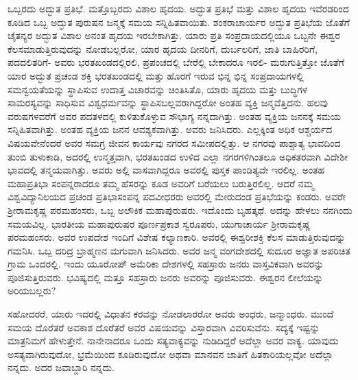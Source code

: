 ಒಬ್ಬರದು ಅದ್ಭುತ ಪ್ರತಿಭೆ. ಮತ್ತೊಬ್ಬರದು ವಿಶಾಲ ಹೃದಯ. ಅದ್ಭುತ ಪ್ರತಿಭೆ ಮತ್ತು ವಿಶಾಲ ಹೃದಯ ಇವೆರಡರಿಂದ ಕೂಡಿದ ಒಬ್ಬ ಅದ್ಭುತ ಪುರುಷನ ಜನ್ಮಕ್ಕೆ ಸಮಯ ಸನ್ನಿಹಿತವಾಯಿತು. ಶಂಕರಾಚಾರ್ಯರ ಅದ್ಭುತ ಪ್ರತಿಭೆಯ ಜೊತೆಗೆ ಚೈತನ್ಯರ ಅದ್ಭುತ ವಿಶಾಲ ಅನಂತ ಹೃದಯ ಇರಬೇಕಾಗಿತ್ತು. ಯಾರು ಪ್ರತಿ ಸಂಪ್ರದಾಯದಲ್ಲಿಯೂ ಒಬ್ಬನೇ ಈಶ್ವರ ಕೆಲಸಮಾಡುತ್ತಿರುವುದನ್ನು ನೋಡಬಲ್ಲರೋ, ಯಾರ ಹೃದಯ ದೀನರಿಗೆ, ದುರ್ಬಲರಿಗೆ, ಜಾತಿ ಬಾಹಿರರಿಗೆ, ಪದದಲಿತರಿಗೆ- ಅವರು ಭರತಖಂಡದಲ್ಲಿರಲಿ, ಪ್ರಪಂಚದಲ್ಲಿ ಬೇರೆಲ್ಲಿ ಬೇಕಾದರೂ ಇರಲಿ- ಮರುಗುತ್ತಿತ್ತೋ ಜೊತೆಗೆ ಯಾರ ಅದ್ಭುತ ಪ್ರಚಂಡ ಶಕ್ತಿ ಭರತಖಂಡದಲ್ಲಿ ಮತ್ತು ಹೊರಗೆ ಇರುವ ಭಿನ್ನ ಭಿನ್ನ ಸಂಪ್ರದಾಯಗಳಲ್ಲಿ ಸಮನ್ವಯತೆಯನ್ನು ಸ್ಥಾಪಿಸುವ ಉದಾತ್ತ ವಿಚಾರವನ್ನು ಚಿಂತಿಸಿತೊ, ಯಾರು ಹೃದಯ ಮತ್ತು ಬುದ್ಧಿಗಳ ಸಾಮರಸ್ಯವನ್ನು ಸಾಧಿಸುವ ವಿಶ್ವಧರ್ಮವನ್ನು ಸ್ಥಾಪಿಸಬಲ್ಲವರಾಗಿದ್ದರೋ ಅಂತಹ ವ್ಯಕ್ತಿ ಜನ್ಮವೆತ್ತಿದನು. ಹಲವು ವರುಷಗಳವರೆಗೆ ಅವರ ಪದತಳದಲ್ಲಿ ಕುಳಿತುಕೊಳ್ಳುವ ಸೌಭಾಗ್ಯ ನನ್ನದಾಗಿತ್ತು. ಅಂತಹ ವ್ಯಕ್ತಿಯ ಜನನಕ್ಕೆ ಸಮಯ ಸನ್ನಿಹಿತವಾಗಿತ್ತು. ಅಂತಹ ವ್ಯಕ್ತಿಯ ಜನನ ಆವಶ್ಯಕವಾಗಿತ್ತು. ಅವರು ಜನಿಸಿದರು. ಎಲ್ಲಕ್ಕಿಂತ ಅಧಿಕ ಆಶ್ಚರ್ಯದ ವಿಷಯವೇನೆಂದರೆ ಅವರ ಸಮಗ್ರ ಜೀವನ ಕಾರ್ಯವು ನಗರದ ಸಮೀಪದಲ್ಲಿತ್ತು. ಆ ನಗರವು ಪಾಶ್ಚಾತ್ಯ ಭಾವದಿಂದ ತುಂಬಿ ತುಳುಕಾಡಿ, ಅದರಲ್ಲಿ ಉನ್ಮತ್ತವಾಗಿ, ಭರತಖಂಡದ ಉಳಿದ ಎಲ್ಲಾ ನಗರಗಳಿಗಿಂತಲೂ ಅಧಿಕತರವಾಗಿ ವಿದೇಶೀ ಭಾವದಲ್ಲಿ ತನ್ಮಯವಾಗಿತ್ತು. ಅವರು ಅಲ್ಲಿ ವಾಸವಾಗಿದ್ದರೂ ಅವರಲ್ಲಿ ಪುಸ್ತಕ ಪಾಂಡಿತ್ಯವೇ ಇರಲಿಲ್ಲ. ಅಂತಹ ಮಹಾಪ್ರತಿಭಾ ಸಂಪನ್ನರಾದರೂ ತಮ್ಮ ಹೆಸರನ್ನು ಕೂಡ ಅವರಿಗೆ ಬರೆಯಲು ಬರುತ್ತಿರಲಿಲ್ಲ. ಆದರೆ ನಮ್ಮ ವಿಶ್ವವಿದ್ಯಾನಿಲಯದ ಪ್ರಚಂಡ ಪ್ರತಿಭಾಸಂಪನ್ನ ಪದವೀಧರರು ಅವರಲ್ಲಿ ಮೇರುದಂಡ ಪ್ರತಿಭೆಯನ್ನು ಕಂಡರು. ಅವರೇ ಶ‍್ರೀರಾಮಕೃಷ್ಣ ಪರಮಹಂಸರು, ಒಬ್ಬ ಅಲೌಕಿಕ ಮಹಾಪುರುಷರು. ಇದೊಂದು ಬೃಹತ್ಕಥೆ. ಅದನ್ನು ಹೇಳಲು ನನಗಿಂದು ಸಮಯವಿಲ್ಲ. ಭಾರತೀಯ ಮಹಾಪುರುಷರ ಪೂರ್ಣಪ್ರಕಾಶ ಸ್ವರೂಪರು, ಯುಗಾಚಾರ್ಯ ಶ‍್ರೀರಾಮಕೃಷ್ಣ ಪರಮಹಂಸರು. ಅವರ ಉಪದೇಶ ಇಂದಿಗೆ ವಿಶೇಷ ಕಲ್ಯಾಣಕಾರಿ. ಅವರಲ್ಲಿ ಈಶ್ವರೀಶಕ್ತಿ ಕೆಲಸ ಮಾಡುತ್ತಿರುವುದನ್ನು ಗಮನಿಸಿ. ಒಬ್ಬ ದರಿದ್ರ ಬ್ರಾಹ್ಮಣನ ಮಗುವಾಗಿ ಜನಿಸಿದರು. ಅವರ ಜನ್ಮ ವಂಗದೇಶದಲ್ಲಿ ಸುದೂರ ಅಜ್ಞಾತ ಅಪರಿಚಿತ ಗ್ರಾಮ ಒಂದರಲ್ಲಿ. ಇಂದು ಯೂರೋಪ್​ ಅಮೆರಿಕಾ ದೇಶಗಳಲ್ಲಿ ಸಹಸ್ರಾರು ಜನರು ವಾಸ್ತವಿಕವಾಗಿ ಅವರನ್ನು ಪೂಜಿಸುತ್ತಿರುವರು. ಭವಿಷ್ಯದಲ್ಲಿ ಮತ್ತೂ ಸಹಸ್ರಾರು ಜನರು ಅವರನ್ನು ಪೂಜಿಸುವರು. ಈಶ್ವರನ ಲೀಲೆಯನ್ನು ಅರಿಯಬಲ್ಲರು?

ಸಹೋದರರೆ, ಯಾರು ಇದರಲ್ಲಿ ವಿಧಾತನ ಕರವನ್ನು ನೋಡಲಾರರೋ ಅವರು ಅಂಧರು, ಜನ್ಮಾಂಧರು. ಮುಂದೆ ಸಮಯ ದೊರೆತರೆ ಅವಕಾಶ ದೊರೆತರೆ ಅವರ ವಿಷಯವನ್ನು ವಿಸ್ತಾರವಾಗಿ ವಿವರಿಸುವೆನು. ಸದ್ಯಕ್ಕೆ ಇಷ್ಟನ್ನು ಮಾತ್ರನಿಮಗೆ ಹೇಳುತ್ತೇನೆ. ನಾನೇನಾದರೂ ಒಂದು ಸತ್ಯವಾಕ್ಯವನ್ನು ನುಡಿದಿದ್ದರೆ ಅದೆಲ್ಲಾ ಅವರ ವಾಕ್ಯ. ಯಾವುದು ಅಸತ್ಯವಾಗಿರುವುದೋ, ಭ್ರಮೆಯಿಂದ ಕೂಡಿರುವುದೋ ಅಥವಾ ಮಾನವನ ಜಾತಿಗೆ ಹಿತಕಾರಿಯಲ್ಲವೋ ಅದೆಲ್ಲಾ ನನ್ನದು. ಅದರ ಜವಾಬ್ದಾರಿ ನನ್ನದು.

